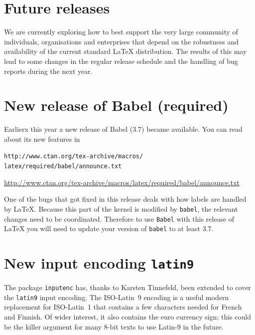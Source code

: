 \documentclass{ltnews}
\providecommand\pkg[1]{\texttt{#1}}
\providecommand\option[1]{\texttt{#1}}
\providecommand\file[1]{\texttt{#1}}
\begin{document}
\maketitle

\raisefirstsection
\section{Future releases}

We are currently exploring how to best support the very large
community of individuals, organisations and enterprises that depend on
the robustness and availability of the current standard \LaTeX{}
distribution.  The results of this may lead to some changes in the
regular release schedule and the handling of bug reports during the
next year.

\section{New release of \textsf{Babel} (required)}

Earlierx this year a new release of \textsf{Babel} (3.7) became
available. You can read about its new features in
\begin{latexonly}
  \file{http://www.ctan.org/tex-archive/macros/}\\
  \hspace*{4em}\file{latex/required/babel/announce.txt}
\end{latexonly}
\begin{htmlonly}
  \url{http://www.ctan.org/tex-archive/macros/latex/required/babel/announce.txt}
\end{htmlonly}

One of the bugs that got fixed in this release deals with how labels
are handled by \LaTeX{}.  Because this part of the kernel is modified
by \pkg{babel}, the relevant changes need to be coordinated.
Therefore to use \pkg{Babel} with this release of \LaTeX{} you will
need to update your version of \pkg{babel} to at least 3.7.

\section{New input encoding \option{latin9}}

The package \pkg{inputenc} has, thanks to Karsten Tinnefeld, been
extended to cover the \option{latin9} input encoding.  The
ISO-Latin~9 encoding is a useful modern replacement for ISO-Latin~1
that contains a few characters needed for French and Finnish. Of wider
interest, it also contains the euro currency sign; this could be the
killer argument for many 8-bit texts to use Latin-9 in the future.
\end{document}
